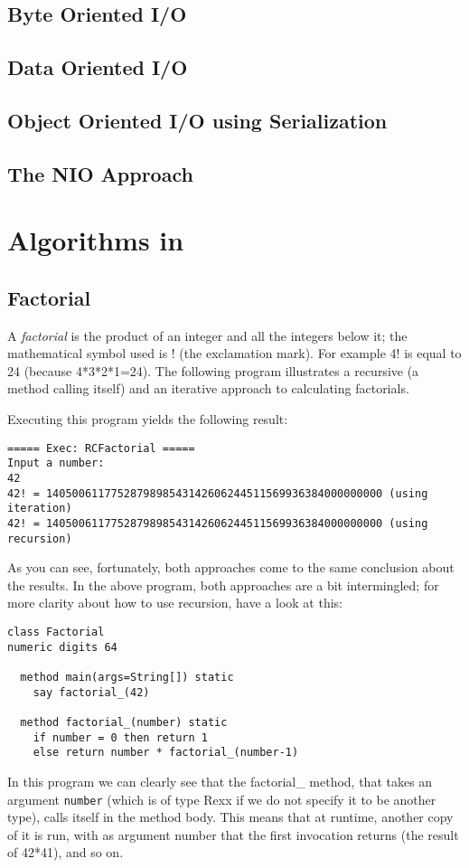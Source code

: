 {\section{Byte Oriented I/O}
\section{Data Oriented I/O}
\section{Object Oriented I/O using Serialization}
\section{The NIO Approach}
\chapter{Algorithms in \nr}{}
\section{Factorial}
A \emph{factorial} is the product of an integer and all the integers
below it; the mathematical symbol used is ! (the exclamation mark). For
example 4! is equal to 24 (because 4*3*2*1=24). The
following program illustrates a recursive (a method calling itself)
and an iterative approach to calculating factorials.

Executing this program yields the following result:
\begin{verbatim}
===== Exec: RCFactorial =====
Input a number: 
42
42! = 1405006117752879898543142606244511569936384000000000 (using iteration)
42! = 1405006117752879898543142606244511569936384000000000 (using recursion)
\end{verbatim}
As you can see, fortunately, both approaches come to the same
conclusion about the results. In the above program, both
approaches are a bit intermingled; for more clarity about how to use
recursion, have a look at this:
\begin{lstlisting}[label=factorialrecursive, caption=Factorial Recursive]
class Factorial
numeric digits 64

  method main(args=String[]) static
    say factorial_(42)

  method factorial_(number) static
    if number = 0 then return 1
    else return number * factorial_(number-1)

\end{lstlisting}
In this program we can clearly see that the factorial\_ method, that
takes an argument \texttt{number} (which is of type Rexx if we do not
specify it to be another type), calls itself in the method body. This
means that at runtime, another copy of it is run, with as argument
number that the first invocation returns (the result of 42*41), and so
on.

}
